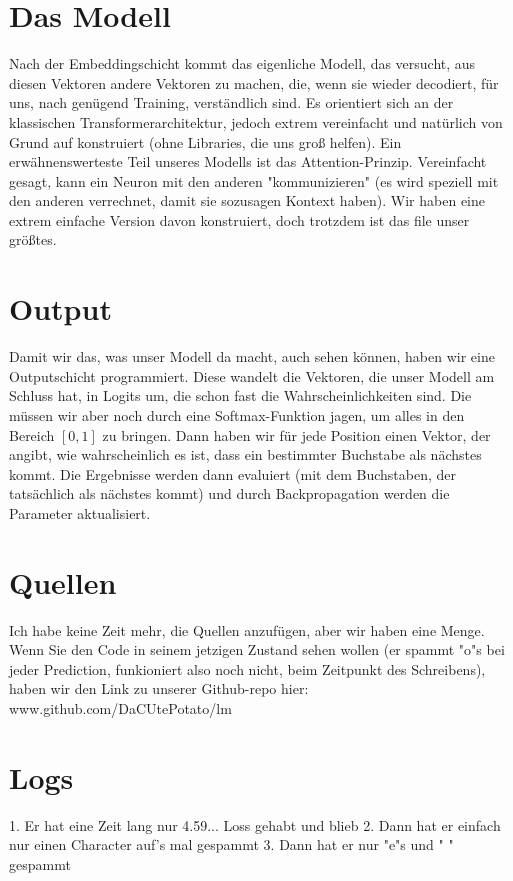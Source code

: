 \documentclass[12pt, letterpaper]{article}
\begin{document}
\section{Das Modell}
Nach der Embeddingschicht kommt das eigenliche Modell, das versucht, aus diesen Vektoren andere Vektoren zu machen, die, wenn sie wieder decodiert, für uns, nach genügend Training, verständlich sind. Es orientiert sich an der klassischen Transformerarchitektur, jedoch extrem vereinfacht und natürlich von Grund auf konstruiert (ohne Libraries, die uns groß helfen). Ein erwähnenswerteste Teil unseres Modells ist das Attention-Prinzip. Vereinfacht gesagt, kann ein Neuron mit den anderen "kommunizieren" (es wird speziell mit den anderen verrechnet, damit sie sozusagen Kontext haben). Wir haben eine extrem einfache Version davon konstruiert, doch trotzdem ist das file unser größtes. 
\section{Output}
Damit wir das, was unser Modell da macht, auch sehen können, haben wir eine Outputschicht programmiert. Diese wandelt die Vektoren, die unser Modell am Schluss hat, in Logits um, die schon fast die Wahrscheinlichkeiten sind. Die müssen wir aber noch durch eine Softmax-Funktion jagen, um alles in den Bereich $[0, 1]$ zu bringen. Dann haben wir für jede Position einen Vektor, der angibt, wie wahrscheinlich es ist, dass ein bestimmter Buchstabe als nächstes kommt. Die Ergebnisse werden dann evaluiert (mit dem Buchstaben, der tatsächlich als nächstes kommt) und durch Backpropagation werden die Parameter aktualisiert. 

\section{Quellen}
Ich habe keine Zeit mehr, die Quellen anzufügen, aber wir haben eine Menge. Wenn Sie den Code in seinem jetzigen Zustand sehen wollen (er spammt "o"s bei jeder Prediction, funkioniert also noch nicht, beim Zeitpunkt des Schreibens), haben wir den Link zu unserer Github-repo hier:\\
www.github.com/DaCUtePotato/lm

\section{Logs}
1. Er hat eine Zeit lang nur 4.59... Loss gehabt und blieb
2. Dann hat er einfach nur einen Character auf's mal gespammt
3. Dann hat er nur "e"s und " " gespammt
\end{document}
